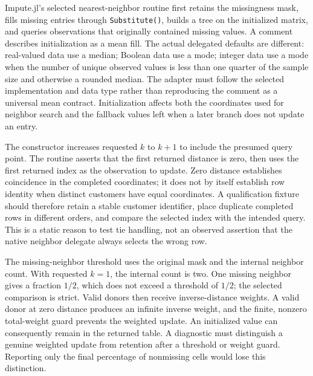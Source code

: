 Impute.jl's selected nearest-neighbor routine first retains the missingness mask, fills missing entries through \texttt{Substitute()}, builds a tree on the initialized matrix, and queries observations that originally contained missing values. A comment describes initialization as a mean fill. The actual delegated defaults are different: real-valued data use a median; Boolean data use a mode; integer data use a mode when the number of unique observed values is less than one quarter of the sample size and otherwise a rounded median. The adapter must follow the selected implementation and data type rather than reproducing the comment as a universal mean contract. Initialization affects both the coordinates used for neighbor search and the fallback values left when a later branch does not update an entry.\citep{exec25_otm_imputejl}

The constructor increases requested $k$ to $k+1$ to include the presumed query point. The routine asserts that the first returned distance is zero, then uses the first returned index as the observation to update. Zero distance establishes coincidence in the completed coordinates; it does not by itself establish row identity when distinct customers have equal coordinates. A qualification fixture should therefore retain a stable customer identifier, place duplicate completed rows in different orders, and compare the selected index with the intended query. This is a static reason to test tie handling, not an observed assertion that the native neighbor delegate always selects the wrong row.\citep{exec25_otm_imputejl,exec25_otm_choice}

The missing-neighbor threshold uses the original mask and the internal neighbor count. With requested $k=1$, the internal count is two. One missing neighbor gives a fraction $1/2$, which does not exceed a threshold of $1/2$; the selected comparison is strict. Valid donors then receive inverse-distance weights. A valid donor at zero distance produces an infinite inverse weight, and the finite, nonzero total-weight guard prevents the weighted update. An initialized value can consequently remain in the returned table. A diagnostic must distinguish a genuine weighted update from retention after a threshold or weight guard. Reporting only the final percentage of nonmissing cells would lose this distinction.\citep{exec25_otm_imputejl,exec25_otm_choice}

